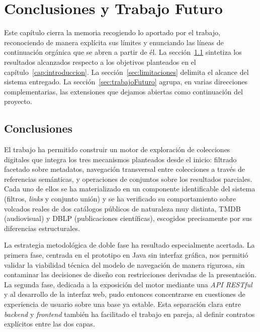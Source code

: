 \chapter{Conclusiones y Trabajo Futuro}
\label{cap:conclusiones}


Este capítulo cierra la memoria recogiendo lo aportado por el trabajo, reconociendo de manera
explícita sus límites y enunciando las líneas de continuación orgánica que se abren a partir
de él. La sección~\ref{sec:conclusiones} sintetiza los resultados alcanzados respecto a los
objetivos planteados en el capítulo~\ref{cap:introduccion}. La sección~\ref{sec:limitaciones}
delimita el alcance del sistema entregado. La sección~\ref{sec:trabajoFuturo} agrupa, en varias
direcciones complementarias, las extensiones que dejamos abiertas como continuación del proyecto.

\section{Conclusiones}
\label{sec:conclusiones}

El trabajo ha permitido construir un motor de exploración de colecciones digitales que integra
los tres mecanismos planteados desde el inicio: filtrado facetado sobre metadatos, navegación
transversal entre colecciones a través de referencias semánticas, y operaciones de conjuntos
sobre los resultados parciales. Cada uno de ellos se ha materializado en un componente
identificable del sistema (filtros, \textit{links} y conjunto unión) y se ha verificado su
comportamiento sobre volcados reales de dos catálogos públicos de naturaleza muy distinta, TMDB
(audiovisual) y DBLP (publicaciones científicas), escogidos precisamente por sus diferencias
estructurales.

La estrategia metodológica de doble fase ha resultado especialmente acertada. La primera fase,
centrada en el prototipo en Java sin interfaz gráfica, nos permitió validar la viabilidad técnica
del modelo de navegación de manera rigurosa, sin contaminar las decisiones de diseño con
restricciones derivadas de la presentación. La segunda fase, dedicada a la exposición del motor
mediante una \textit{API RESTful} y al desarrollo de la interfaz web, pudo entonces concentrarse
en cuestiones de experiencia de usuario sobre una base ya estable. Esta separación clara entre
\textit{backend} y \textit{frontend} también ha facilitado el trabajo en pareja, al definir
contratos explícitos entre las dos capas.

